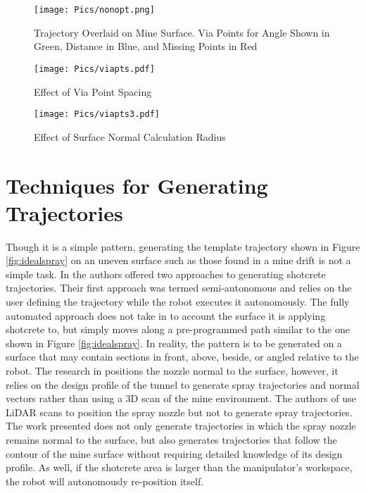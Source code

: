 \begin{figure}[h]
    \centering
    \texttt{[image: Pics/nonopt.png]}
    \caption{Trajectory Overlaid on Mine Surface. Via Points for Angle Shown in Green, Distance in Blue, and Missing Points in Red}
    \label{fig:unidealspray}
\end{figure}

\begin{figure}[h]
    \centering
    \texttt{[image: Pics/viapts.pdf]}
    \caption{Effect of Via Point Spacing}
    \label{fig:viapts}
\end{figure}
\begin{figure}[h]
    \centering
    \texttt{[image: Pics/viapts3.pdf]}
    \caption{Effect of Surface Normal Calculation Radius}
    \label{fig:vianorm}
\end{figure}

\section{Techniques for Generating Trajectories}
Though it is a simple pattern, generating the template trajectory shown in Figure \ref{fig:idealspray} on an uneven surface such as those found in a mine drift is not a simple task. In \cite{fully} the authors offered two approaches to generating shotcrete trajectories. Their first approach was termed semi-autonomous and relies on the user defining the trajectory while the robot executes it autonomously. The fully automated approach does not take in to account the surface it is applying shotcrete to, but simply moves along a pre-programmed path similar to the one shown in Figure \ref{fig:idealspray}. In reality, the pattern is to be generated on a surface that may contain sections in front, above, beside, or angled relative to the robot. The research in \cite{steal} positions the nozzle normal to the surface, however, it relies on the design profile of the tunnel to generate spray trajectories and normal vectors rather than using a 3D scan of the mine environment. The authors of \cite{artd} use LiDAR scans to position the spray nozzle but not to generate spray trajectories. The work presented does not only generate trajectories in which the spray nozzle remains normal to the surface, but also generates trajectories that follow the contour of the mine surface without requiring detailed knowledge of its design profile. As well, if the shotcrete area is larger than the manipulator's workspace, the robot will autonomously re-position itself.\\

